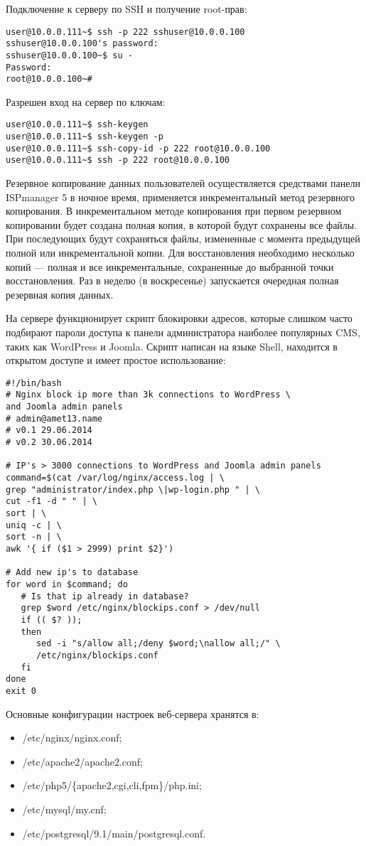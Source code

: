 Подключение к серверу по SSH и получение root-прав:
\begin{lstlisting}
user@10.0.0.111~$ ssh -p 222 sshuser@10.0.0.100
sshuser@10.0.0.100's password:
sshuser@10.0.0.100~$ su -
Password:
root@10.0.0.100~#
\end{lstlisting}

Разрешен вход на сервер по ключам:
\begin{lstlisting}
user@10.0.0.111~$ ssh-keygen
user@10.0.0.111~$ ssh-keygen -p
user@10.0.0.111~$ ssh-copy-id -p 222 root@10.0.0.100
user@10.0.0.111~$ ssh -p 222 root@10.0.0.100
\end{lstlisting}

Резервное копирование данных пользователей осуществляется средствами панели ISPmanager 5 в ночное время, применяется инкрементальный метод резервного копирования.
В инкрементальном методе копирования при первом резервном копировании будет создана полная копия, в которой будут сохранены все файлы.
При последующих будут сохраняться файлы, измененные с момента предыдущей полной или инкрементальной копии.
Для восстановления необходимо несколько копий --- полная и все инкрементальные, сохраненные до выбранной точки восстановления.
Раз в неделю (в воскресенье) запускается очередная полная резервная копия данных.

На сервере функционирует скрипт блокировки адресов, которые слишком часто подбирают пароли доступа к панели администратора наиболее популярных CMS, таких как WordPress и Joomla.
Скрипт написан на языке Shell, находится в открытом доступе и имеет простое использование:
\begin{lstlisting}
#!/bin/bash
# Nginx block ip more than 3k connections to WordPress \
and Joomla admin panels
# admin@amet13.name
# v0.1 29.06.2014
# v0.2 30.06.2014

# IP's > 3000 connections to WordPress and Joomla admin panels
command=$(cat /var/log/nginx/access.log | \
grep "administrator/index.php \|wp-login.php " | \
cut -f1 -d " " | \
sort | \
uniq -c | \
sort -n | \
awk '{ if ($1 > 2999) print $2}')

# Add new ip's to database
for word in $command; do
   # Is that ip already in database?
   grep $word /etc/nginx/blockips.conf > /dev/null
   if (( $? ));
   then 
      sed -i "s/allow all;/deny $word;\nallow all;/" \
      /etc/nginx/blockips.conf
   fi
done
exit 0
\end{lstlisting}

Основные конфигурации настроек веб-сервера хранятся в:
\begin{itemize}
  \item /etc/nginx/nginx.conf;
  \item /etc/apache2/apache2.conf;
  \item /etc/php5/\{apache2,cgi,cli,fpm\}/php.ini;
  \item /etc/mysql/my.cnf;
  \item /etc/postgresql/9.1/main/postgresql.conf.
\end{itemize}

